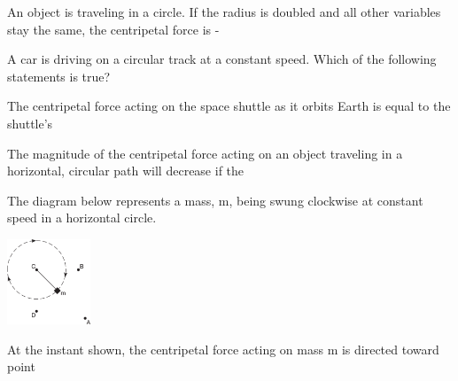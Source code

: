\documentclass[10pt]{examdesign}
\begin{document}
\begin{multiplechoice} [title={Multiple Choice},
	rearrange=no]
\begin{question}
\end{question}



\begin{question}
	 An object is traveling in a circle.  If the radius is doubled and all other variables stay the same, the centripetal force is - 
\end{question}


	
\begin{question}
	A car is driving on a circular track at a constant speed.  Which of the following statements is true?
	
\end{question}

\begin{question}
	The centripetal force acting on the space shuttle as it orbits Earth is equal to the shuttle’s
	\end{question}

\begin{question}
The magnitude of the centripetal force acting on an object traveling in a horizontal, circular path will decrease if the 



\end{question}



\begin{question}
	The diagram below represents a mass, m, being 	swung clockwise at constant speed in a horizontal 	circle.
\begin{center}
	\includegraphics[height=1in]{centripetal1.png}
\end{center}
	At the instant shown, the centripetal force acting on mass m is directed toward point


\end{question}
\end{multiplechoice}
\end{document}
